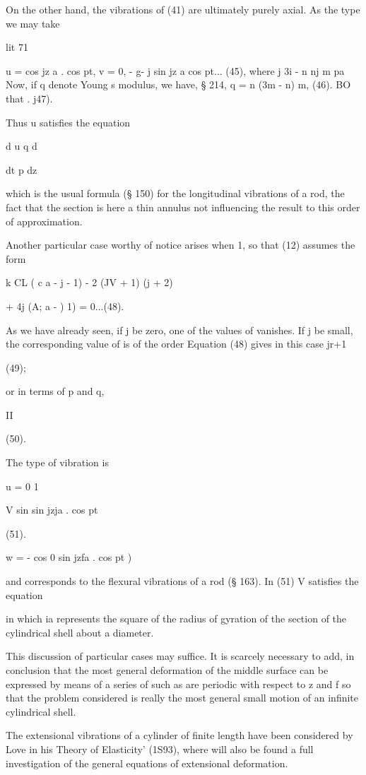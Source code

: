 On the other hand, the vibrations of (41) are ultimately purely axial. As the
type we may take

lit  71

u = cos jz a . cos pt, v = 0, - g- j sin jz a cos pt... (45), where j  3i - n
nj m pa Now, if q denote Young s modulus, we have, § 214, q = n (3m - n) m,
(46).  BO that . j47).

Thus u satisfies the equation

d u  q d

dt p dz

which is the usual formula (§ 150) for the longitudinal vibrations of a rod,
the fact that the section is here a thin annulus not influencing the result to
this order of approximation.

Another particular case worthy of notice arises when 1, so that (12) assumes
the form

k CL ( c a - j - 1) - 2 (JV + 1) (j + 2)

+ 4j (A; a - ) 1) = 0...(48).

As we have already seen, if j be zero, one of the values of vanishes. If j be
small, the corresponding value of is of the order Equation (48) gives in this
case jr+1

(49);

or in terms of p and q,

II

(50).

 The type of vibration is

u = 0  1

V  sin  sin jzja . cos pt

(51).

w = - cos 0 sin jzfa . cos pt )

and corresponds to the flexural vibrations of a rod (§ 163). In (51) V
satisfies the equation

in which ia represents the square of the radius of gyration of the section of
the cylindrical shell about a diameter.

This discussion of particular cases may suffice. It is scarcely necessary to
add, in conclusion that the most general deformation of the middle surface can
be expressed by means of a series of such as are periodic with respect to z and
f so that the problem considered is really the most general small motion of an
infinite cylindrical shell.

The extensional vibrations of a cylinder of finite length have been considered
by Love in his Theory of Elasticity’ (1S93), where will also be found a full
investigation of the general equations of extensional deformation.

